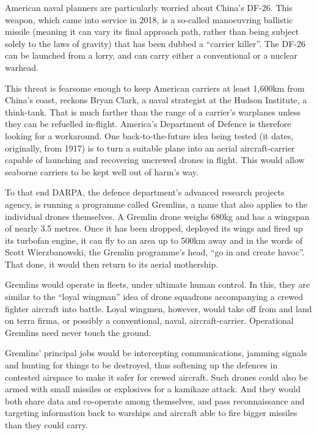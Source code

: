 \documentclass{article}
\begin{document}
American naval planners are particularly worried about China's DF-26. This weapon, which came into service in 2018, is a so-called manoeuvring ballistic missile (meaning it can vary its final approach path, rather than being subject solely to the laws of gravity) that has been dubbed a ``carrier killer''. The DF-26 can be launched from a lorry, and can carry either a conventional or a nuclear warhead. 

This threat is fearsome enough to keep American carriers at least 1,600km from China's coast, reckons Bryan Clark, a naval strategist at the Hudson Institute, a think-tank. That is much farther than the range of a carrier's warplanes unless they can be refuelled in-flight. America's Department of Defence is therefore looking for a workaround. One back-to-the-future idea being tested (it dates, originally, from 1917) is to turn a suitable plane into an aerial aircraft-carrier capable of launching and recovering uncrewed drones in flight. This would allow seaborne carriers to be kept well out of harm's way. 

To that end DARPA, the defence department's advanced research projects agency, is running a programme called Gremlins, a name that also applies to the individual drones themselves. A Gremlin drone weighs 680kg and has a wingspan of nearly 3.5 metres. Once it has been dropped, deployed its wings and fired up its turbofan engine, it can fly to an area up to 500km away and in the words of Scott Wierzbanowski, the Gremlin programme's head, ``go in and create havoc''. That done, it would then return to its aerial mothership. 

Gremlins would operate in fleets, under ultimate human control. In this, they are similar to the ``loyal wingman'' idea of drone squadrons accompanying a crewed fighter aircraft into battle. Loyal wingmen, however, would take off from and land on terra firma, or possibly a conventional, naval, aircraft-carrier. Operational Gremlins need never touch the ground. 

Gremlins' principal jobs would be intercepting communications, jamming signals and hunting for things to be destroyed, thus softening up the defences in contested airspace to make it safer for crewed aircraft. Such drones could also be armed with small missiles or explosives for a kamikaze attack. And they would both share data and co-operate among themselves, and pass reconnaissance and targeting information back to warships and aircraft able to fire bigger missiles than they could carry. 
\end{document}
